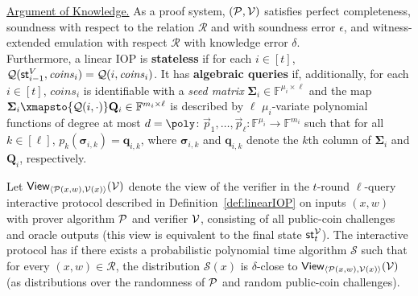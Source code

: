 \begin{definition} [Public-coin linear IOP]


\noindent \underline{Argument of Knowledge.} As a proof system, $(\mathcal{P}, \mathcal{V})$ satisfies perfect completeness, soundness with respect to the relation $\mathcal{R}$ and with soundness error $\epsilon$, and witness-extended emulation with respect $\mathcal{R}$ with knowledge error $\delta$. \\

Furthermore, a linear IOP is \textbf{stateless} if for each $i \in [t]$, $\mathcal{Q}(\textsf{st}^V_{i-1}, \mathit{coins}_i) = \mathcal{Q}(i, \mathit{coins}_i)$.
It has \textbf{algebraic queries} if, additionally, for each $i \in [t]$, $\mathit{coins}_i$ is identifiable with a \emph{seed matrix} $\boldsymbol{\Sigma}_i \in \mathbb{F}^{\mu_i \times \ell}$ and the map $\boldsymbol{\Sigma}_i \xmapsto{\mathcal{Q}(i, \cdot)} \mathbf{Q}_i \in \mathbb{F}^{m_i \times \ell}$
is described by $\ell$ $\mu_i$-variate polynomial functions of degree at most $d = \poly$: $\vec{p}_1, \ldots, \vec{p}_\ell : \mathbb{F}^{\mu_i} \rightarrow \mathbb{F}^{m_i}$ such that for all $k \in [\ell]$, $p_k(\boldsymbol{\sigma}_{i,k}) = \mathbf{q}_{i,k}$, where $\boldsymbol{\sigma}_{i,k}$ and $\mathbf{q}_{i,k}$ denote the $k$th column of $\boldsymbol{\Sigma}_i$ and $\mathbf{Q}_i$, respectively.

\end{definition} 


\begin{definition}
Let $\textsf{View}_{\langle \mathcal{P}(x, w), \mathcal{V}(x) \rangle}(\mathcal{V})$ denote the view of the verifier in the $t$-round $\ell$-query interactive protocol described in Definition~\ref{def:linearIOP} on inputs $(x,w)$ with prover algorithm $\mathcal{P}$ and verifier $\mathcal{V}$, consisting of all public-coin challenges and oracle outputs (this view is equivalent to the final state $\textsf{st}^\mathcal{V}_t$). The interactive protocol has  if there exists a probabilistic polynomial time algorithm $\mathcal{S}$ such that for every $(x, w) \in \mathcal{R}$, the distribution $\mathcal{S}(x)$ is $\delta$-close to $\textsf{View}_{\langle \mathcal{P}(x, w), \mathcal{V}(x) \rangle}(\mathcal{V})$ (as distributions over the randomness of $\mathcal{P}$ and random public-coin challenges).
\end{definition}

